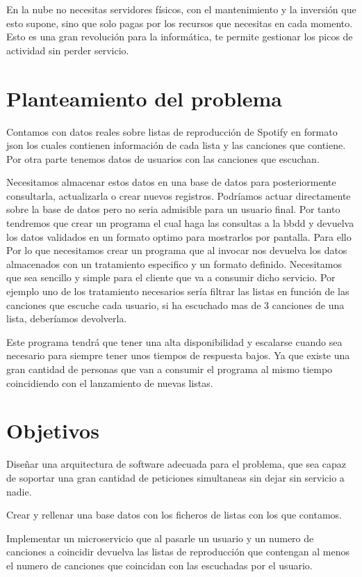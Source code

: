 \documentclass[12pt]{report} %
\begin{document}
	En la nube no necesitas servidores físicos, con el mantenimiento y la inversión que esto supone, sino que solo pagas por los recursos que necesitas en cada momento. Esto es una gran revolución para la informática, te permite gestionar los picos de actividad sin perder servicio.
	
	
	\section{Planteamiento del problema}
	Contamos con datos reales sobre listas de reproducción de Spotify en formato json los cuales contienen información de cada lista y las canciones que contiene.
	Por otra parte tenemos datos de usuarios con las canciones que escuchan.

	Necesitamos almacenar estos datos en una base de datos para posteriormente consultarla, actualizarla o crear nuevos registros. 
	Podríamos actuar directamente sobre la base de datos pero no seria admisible para un usuario final. 
	Por tanto tendremos que crear un programa el cual haga las consultas a la bbdd y devuelva los datos validados en un formato optimo para mostrarlos por pantalla.
	Para ello Por lo que necesitamos crear un programa que al invocar nos devuelva los datos almacenados con un tratamiento especifico y un formato definido. Necesitamos que sea sencillo y simple para el cliente que va a consumir dicho servicio. 
	Por ejemplo uno de los tratamiento necesarios sería filtrar las listas en función de las canciones que escuche cada usuario, si ha escuchado mas de 3 canciones de una lista, deberíamos devolverla.
		
	Este programa tendrá que tener una alta disponibilidad y escalarse cuando sea necesario para siempre tener unos tiempos de respuesta bajos. Ya que existe una gran cantidad de personas que van a consumir el programa al mismo tiempo coincidiendo con el lanzamiento de nuevas listas.
	
	\section{Objetivos}
		
	Diseñar una arquitectura de software adecuada para el problema, que sea capaz de soportar una gran cantidad de peticiones simultaneas sin dejar sin servicio a nadie.
	
	Crear y rellenar una base datos con los ficheros de listas con los que contamos.
	
	Implementar un microservicio que al pasarle un usuario y un numero de canciones a coincidir devuelva las listas de reproducción que contengan al menos el numero de canciones que coincidan con las escuchadas por el usuario.
	
\end{document}
